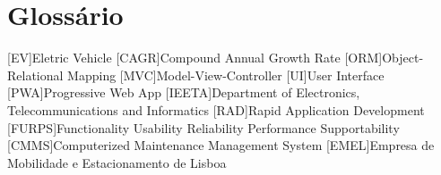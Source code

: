 \chapter{Glossário}

\footnotesize
\SingleSpacing

\begin{multicols}{2}
\begin{acronym}[AAAAAA]

	[EV]{Eletric Vehicle}
	[CAGR]{Compound Annual Growth Rate}
	[ORM]{Object-Relational Mapping}
	[MVC]{Model-View-Controller}
	[UI]{User Interface}
	[PWA]{Progressive Web App}
	[IEETA]{Department of Electronics, Telecommunications and Informatics}
	[RAD]{Rapid Application Development}
	[FURPS]{Functionality Usability Reliability Performance Supportability}
	[CMMS]{Computerized Maintenance Management System}
	[EMEL]{Empresa de Mobilidade e Estacionamento de Lisboa}
	

\end{acronym}
\end{multicols}

